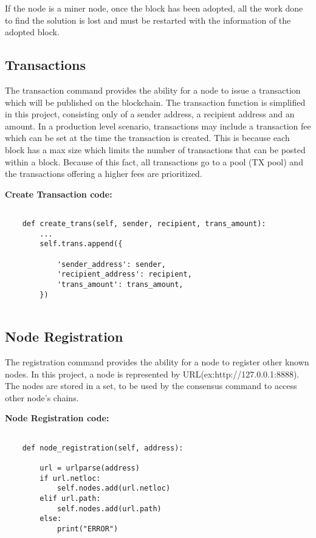 If the node is a miner node, once the block has been adopted, all the work done to find the solution is lost and must be restarted with the information of the adopted block.

\subsection{Transactions}

The transaction command provides the ability for a node to issue a transaction which will be 
published on the blockchain. The transaction function is simplified in this project, 
consisting only of a sender address, a recipient address and an amount. In a production level 
scenario, transactions may include a transaction fee which can be set at the time the transaction is created. This is because each block has a max size which limits the number of transactions that can be posted within a block. Because of this fact, all transactions go to a pool (TX pool) and the transactions offering a higher fees are prioritized. 

\bigskip
\noindent
\textbf{Create Transaction code:}
\begin{footnotesize}
\begin{verbatim}

    def create_trans(self, sender, recipient, trans_amount):
        ...
        self.trans.append({

            'sender_address': sender,
            'recipient_address': recipient,
            'trans_amount': trans_amount,
        })
        
\end{verbatim}
\end{footnotesize}

\subsection{Node Registration}

The registration command provides the ability for a node to register other known nodes. In this project, a node is represented by URL(ex:http://127.0.0.1:8888). The nodes are stored in a set, to be used by the consensus command to access other node's chains.

\bigskip
\noindent
\textbf{Node Registration code:}
\begin{footnotesize}
\begin{verbatim}

    def node_registration(self, address):

        url = urlparse(address)
        if url.netloc:
            self.nodes.add(url.netloc)
        elif url.path:
            self.nodes.add(url.path)
        else:
            print("ERROR")
        
\end{verbatim}
\end{footnotesize}


